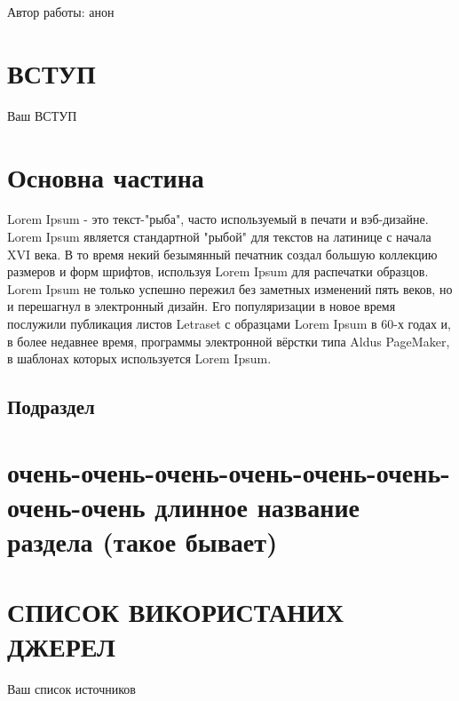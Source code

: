 \documentclass[a4paper, 14pt]{article}
\let\stdsection\section
\renewcommand\section{\newpage\stdsection}
\begin{document}
\newpage
Автор работы: анон
\newpage

\renewcommand{\contentsname}{\normalsize \hspace{1.25em} ЗМІСТ} %

\tableofcontents %

\newpage
{} %
\section*{\textbf{ВСТУП}}
Ваш ВСТУП
\newpage %
\section{Основна частина}
Lorem Ipsum - это текст-"рыба", часто используемый в печати и вэб-дизайне. Lorem Ipsum является стандартной "рыбой" для текстов на латинице с начала XVI века. В то время некий безымянный печатник создал большую коллекцию размеров и форм шрифтов, используя Lorem Ipsum для распечатки образцов. Lorem Ipsum не только успешно пережил без заметных изменений пять веков, но и перешагнул в электронный дизайн. Его популяризации в новое время послужили публикация листов Letraset с образцами Lorem Ipsum в 60-х годах и, в более недавнее время, программы электронной вёрстки типа Aldus PageMaker, в шаблонах которых используется Lorem Ipsum.

\subsection{Подраздел}
\section{очень-очень-очень-очень-очень-очень-очень-очень длинное название раздела (такое бывает)}
\section*{СПИСОК ВИКОРИСТАНИХ ДЖЕРЕЛ}
Ваш список источников
\end{document}
